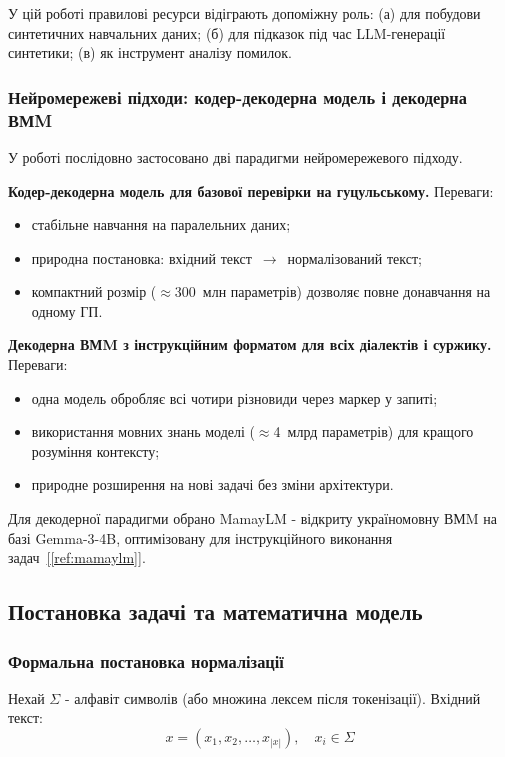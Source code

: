 \documentclass[14pt]{extarticle}
\newcommand{\citeref}[1]{\hyperref[#1]{[\ref*{#1}]}}
\begin{document}
У цій роботі правилові ресурси відіграють допоміжну роль: (а) для побудови синтетичних навчальних даних; (б) для підказок під час LLM-генерації синтетики; (в) як інструмент аналізу помилок.

\subsubsection{Нейромережеві підходи: кодер-декодерна модель і декодерна ВМM}

У роботі послідовно застосовано дві парадигми нейромережевого підходу.

\textbf{Кодер-декодерна модель для базової перевірки на гуцульському.} Переваги:
\begin{itemize}
  \item стабільне навчання на паралельних даних;
  \item природна постановка: вхідний текст~$\to$~нормалізований текст;
  \item компактний розмір ($\approx$300~млн параметрів) дозволяє повне донавчання на одному ГП.
\end{itemize}

\textbf{Декодерна ВМM з інструкційним форматом для всіх діалектів і суржику.} Переваги:
\begin{itemize}
  \item одна модель обробляє всі чотири різновиди через маркер у запиті;
  \item використання мовних знань моделі ($\approx$4~млрд параметрів) для кращого розуміння контексту;
  \item природне розширення на нові задачі без зміни архітектури.
\end{itemize}

Для декодерної парадигми обрано MamayLM - відкриту україномовну ВМM на базі Gemma-3-4B, оптимізовану для інструкційного виконання задач~\citeref{ref:mamaylm}.

\subsection{Постановка задачі та математична модель}

\subsubsection{Формальна постановка нормалізації}

Нехай $\Sigma$ - алфавіт символів (або множина лексем після токенізації). Вхідний текст:
\begin{equation}
  x = (x_1, x_2, \ldots, x_{|x|}), \quad x_i \in \Sigma
  \label{eq:input_seq}
\end{equation}
\end{document}
